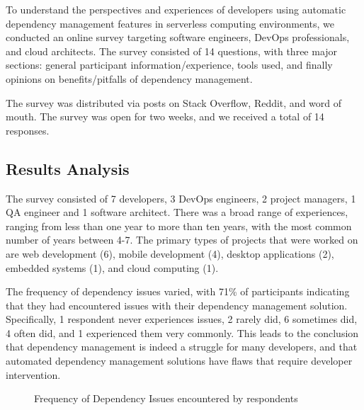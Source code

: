 \documentclass[sigconf]{acmart}
\begin{document}
To understand the perspectives and experiences of developers using automatic dependency management features in serverless computing environments, we conducted an online survey targeting software engineers, DevOps professionals, and cloud architects. The survey consisted of 14 questions, with three major sections: general participant information/experience, tools used, and finally opinions on benefits/pitfalls of dependency management.

The survey was distributed via posts on Stack Overflow, Reddit, and word of mouth. The survey was open for two weeks, and we received a total of 14 responses.

\subsection{Results Analysis}

The survey consisted of 7 developers, 3 DevOps engineers, 2 project managers, 1 QA engineer and 1 software architect. There was a broad range of experiences, ranging from less than one year to more than ten years, with the most common number of years between 4-7. The primary types of projects that were worked on are web development (6), mobile development (4), desktop applications (2), embedded systems (1), and cloud computing (1).

The frequency of dependency issues varied, with 71\% of participants indicating that they had encountered issues with their dependency management solution. Specifically, 1 respondent never experiences issues, 2 rarely did, 6 sometimes did, 4 often did, and 1 experienced them very commonly. This leads to the conclusion that dependency management is indeed a struggle for many developers, and that automated dependency management solutions have flaws that require developer intervention.

\begin{figure}[ht]
	\centering
	\caption{Frequency of Dependency Issues encountered by respondents}
	\label{fig:frequency}
\end{figure}
\end{document}
